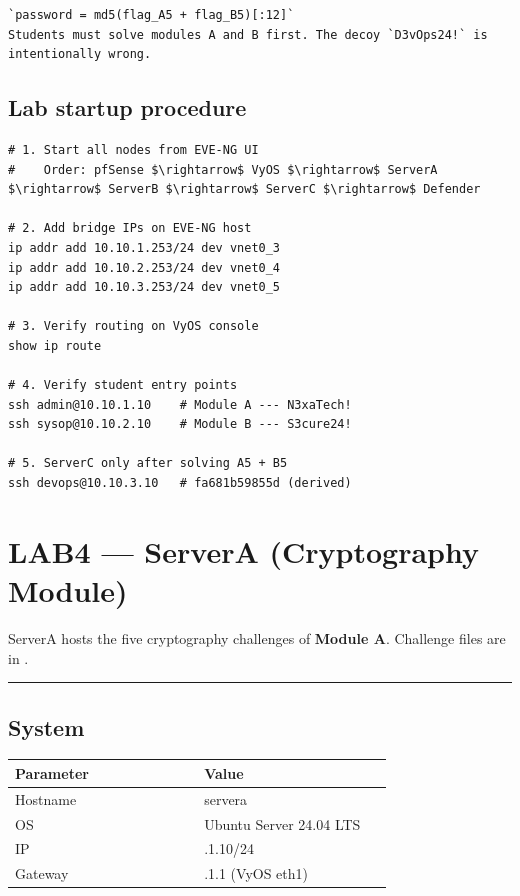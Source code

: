 \begin{lstlisting}
`password = md5(flag_A5 + flag_B5)[:12]`
Students must solve modules A and B first. The decoy `D3vOps24!` is intentionally wrong.
\end{lstlisting}

\subsection{Lab startup procedure}

\begin{lstlisting}
# 1. Start all nodes from EVE-NG UI
#    Order: pfSense $\rightarrow$ VyOS $\rightarrow$ ServerA $\rightarrow$ ServerB $\rightarrow$ ServerC $\rightarrow$ Defender

# 2. Add bridge IPs on EVE-NG host
ip addr add 10.10.1.253/24 dev vnet0_3
ip addr add 10.10.2.253/24 dev vnet0_4
ip addr add 10.10.3.253/24 dev vnet0_5

# 3. Verify routing on VyOS console
show ip route

# 4. Verify student entry points
ssh admin@10.10.1.10    # Module A --- N3xaTech!
ssh sysop@10.10.2.10    # Module B --- S3cure24!

# 5. ServerC only after solving A5 + B5
ssh devops@10.10.3.10   # fa681b59855d (derived)
\end{lstlisting}

\section{LAB4 --- ServerA (Cryptography Module)}

ServerA hosts the five cryptography challenges of \textbf{Module A}. Challenge files are in .

\begin{center}\rule{0.5\linewidth}{0.5pt}\end{center}

\subsection{System}

{\footnotesize\begin{longtable}[]{@{}>{\raggedright\arraybackslash}p{0.45\linewidth}
  >{\raggedright\arraybackslash}p{0.45\linewidth}@{}}
\toprule\noalign{}
Parameter & Value \\
\midrule\noalign{}
\endhead
\bottomrule\noalign{}
\endlastfoot
Hostname & servera \\
OS & Ubuntu Server 24.04 LTS \\
IP & 10.10.1.10/24 \\
Gateway & 10.10.1.1 (VyOS eth1) \\
\end{longtable}}


